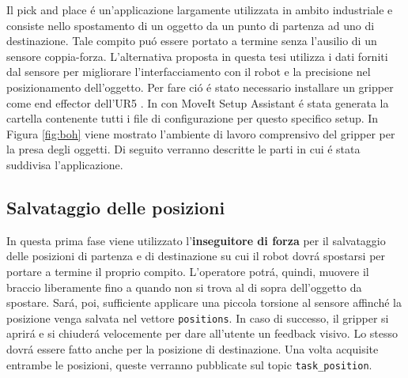 Il pick and place \'{e} un'applicazione largamente utilizzata in ambito industriale e consiste nello spostamento di un oggetto 
da un punto di partenza ad uno di destinazione. Tale compito pu\'{o} essere portato a termine senza l'ausilio di un sensore 
coppia-forza. L'alternativa proposta in questa tesi utilizza i dati forniti dal sensore per migliorare l'interfacciamento con il robot 
e la precisione nel posizionamento dell'oggetto. Per fare ci\'{o} \'{e} stato necessario installare un gripper come end effector 
dell'UR5 \cite{gripper_repo}. In \cite{environment_setup} con MoveIt Setup Assistant \'{e} stata generata la cartella contenente 
tutti i file di configurazione per questo specifico setup. 
In Figura \ref{fig:boh} viene mostrato l'ambiente di lavoro comprensivo del gripper per la presa degli oggetti. 
Di seguito verranno descritte le parti in cui \'{e} stata suddivisa l'applicazione.
\subsection{Salvataggio delle posizioni} 
In questa prima fase viene utilizzato l'\textbf{inseguitore di forza} per il salvataggio delle posizioni di partenza e di destinazione 
su cui il robot dovr\'{a} spostarsi per portare a termine il proprio compito. 
L'operatore potr\'{a}, quindi, muovere il braccio liberamente fino a quando non si trova al di sopra dell'oggetto da spostare. 
Sar\'{a}, poi, sufficiente applicare una piccola torsione al sensore affinch\'{e} la posizione venga salvata nel vettore 
\verb|positions|. In caso di successo, il gripper si aprir\'{a} e si chiuder\'{a} velocemente per dare all'utente un feedback visivo. 
Lo stesso dovr\'{a} essere fatto anche per la posizione di destinazione. Una volta acquisite entrambe le posizioni, queste 
verranno pubblicate sul topic \verb|task_position|.